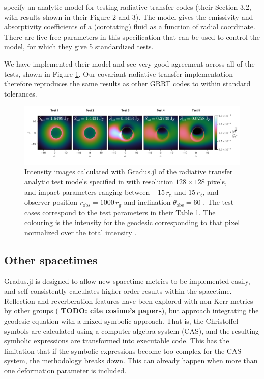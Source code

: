 \documentclass[fleqn,usenatbib]{mnras}
\newcommand{\todo}[1]{{\noindent \bf \color{red} TODO: #1}}
\newcommand{\Gradus}{Gradus.jl }
\newcommand{\rg}{r_\text{g}}
\begin{document}
\cite{gold_verification_2020} specify an analytic model for testing radiative
transfer codes (their Section 3.2, with results shown in their Figure 2 and 3).
The model gives the emissivity and absorptivity coefficients of a (corotating)
fluid as a function of radial coordinate. There are five free parameters in this
specification that can be used to control the model, for which they give 5
standardized tests.

We have implemented their model and see very good agreement across all of the
tests, shown in Figure \ref{fig:gold-test-problems}. Our covariant radiative
transfer implementation therefore reproduces the same results as other GRRT
codes to within standard tolerances.

\begin{figure}
	\centering
	\includegraphics[width=0.99\linewidth]{figures/radiative-transfer.gold.pdf}
	\caption{Intensity images calculated with \Gradus of the radiative transfer analytic test models specified in \citet{gold_verification_2020} with resolution $128 \times 128$ pixels, and impact parameters ranging between $-15\, \rg$ and $15\, \rg$, and observer position $r_\text{obs} = 1000\, \rg$ and inclination $\theta_\text{obs} = 60^\circ$. The test cases correspond to the test parameters in their Table 1. The colouring is the intensity for the geodesic corresponding to that pixel normalized over the total intensity .}
	\label{fig:gold-test-problems}
\end{figure}

\subsection{Other spacetimes}

\Gradus is designed to allow new spacetime metrics to be implemented easily, and
self-consistently calculates higher-order results within the spacetime.
Reflection and reverberation features have been explored with non-Kerr metrics
by other groups (\todo{cite cosimo's papers}), but approach integrating the
geodesic equation with a mixed-symbolic approach. That is, the Christoffel
symbols are calculated using a computer algebra system (CAS), and the resulting
symbolic expressions are transformed into executable code. This has the
limitation that if the symbolic expressions become too complex for the CAS
system, the methodology breaks down. This can already happen when more than one
deformation parameter is included.
\end{document}
